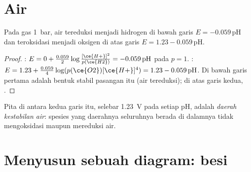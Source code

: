 \section{Air}

\begin{proposition}\label{prop:b1:e-ph-diagrams:water-lines}
Pada gas \qty{1}{bar}, air tereduksi menjadi hidrogen di bawah garis
$E = -0.059\,\mathrm{pH}$ dan teroksidasi menjadi oksigen di atas garis
$E = 1.23
- 0.059\,\mathrm{pH}$.
\end{proposition}

\begin{proof}
: $E = 0 + \frac{0.059}{2}\log\frac{[\ce{H+}]^2}{p(\ce{H2})}
= -0.059\,\mathrm{pH}$ pada $p = 1$. : $E = 1.23 +
\frac{0.059}{4}\log(p(\ce{O2})[\ce{H+}]^4) = 1.23 - 0.059\,\mathrm{pH}$. Di
bawah garis pertama  adalah bentuk stabil pasangan itu (air
tereduksi); di atas garis kedua, .
\end{proof}

\begin{definition}\label{def:b1:e-ph-diagrams:water-domain}
Pita di antara kedua garis itu, selebar \qty{1.23}{V} pada setiap pH,
adalah \emph{daerah kestabilan air}: spesies
yang daerahnya seluruhnya berada di dalamnya tidak mengoksidasi maupun
mereduksi air.
\end{definition}

\section{Menyusun sebuah diagram: besi}

